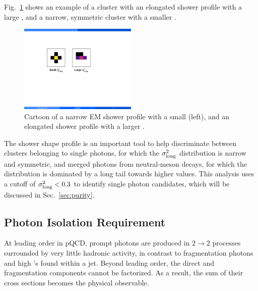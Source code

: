 
Fig.~\ref{fig:sigma_long_shapes} shows an example of a cluster with an elongated shower profile with a large \lambdasquare, and a narrow, symmetric cluster with a smaller \lambdasquare.

\begin{figure}[htpb]
  \centering
  \includegraphics[width=0.5\textwidth]{Data_Analysis/sigma_long_shapes.pdf}
  \caption{Cartoon of a narrow EM shower profile with a small \lambdasquare (left), and an elongated shower profile with a larger \lambdasquare.}
  \label{fig:sigma_long_shapes}
\end{figure}

The shower shape profile is an important tool to help discriminate between clusters belonging to single photons, for which the $\sigma^{2}_{\mathrm{long}}$ distribution is narrow and symmetric, and merged photons from neutral-meson decays, for which the distribution is dominated by a long tail towards higher values. This analysis uses a cutoff of $\sigma^{2}_{\mathrm{long}} < 0.3$ to identify single photon candidates, which will be discussed in Sec.~\ref{sec:purity}.

\subsection{Photon Isolation Requirement}
\label{sec:isolation}
At leading order in pQCD, prompt photons are produced in 2$\to$2 processes surrounded by very little hadronic activity, in contrast to fragmentation photons and high \pt \pizero's found within a jet. Beyond leading order, the direct and fragmentation components cannot be factorized. As a result, the sum of their cross sections becomes the physical observable.\\

